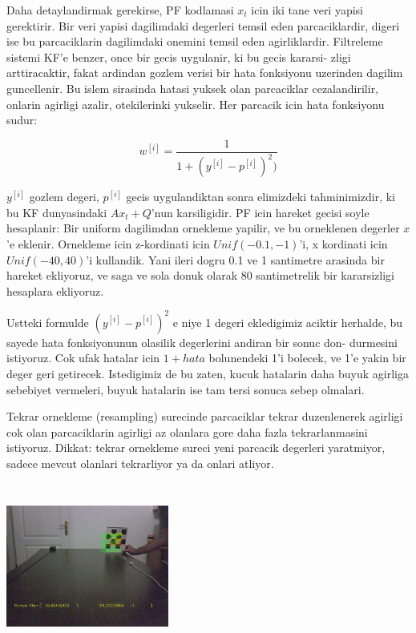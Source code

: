 \documentclass[12pt,fleqn]{article}\usepackage{../common}
\begin{document}
Daha detaylandirmak gerekirse, PF kodlamasi $x_t$ icin iki tane veri yapisi
gerektirir. Bir veri yapisi dagilimdaki degerleri temsil eden
parcaciklardir, digeri ise bu parcaciklarin dagilimdaki onemini temsil eden
agirliklardir.  Filtreleme sistemi KF'e benzer, once bir gecis uygulanir,
ki bu gecis kararsi- zligi arttiracaktir, fakat ardindan gozlem verisi bir
hata fonksiyonu uzerinden dagilim guncellenir. Bu islem sirasinda hatasi
yuksek olan parcaciklar cezalandirilir, onlarin agirligi azalir,
otekilerinki yukselir. Her parcacik icin hata fonksiyonu sudur:

\[ 
w^{[i]} = \frac{1}{1 + (y^{[i]} - p^{[i]})^2  )}
 \]

$y^{[i]}$ gozlem degeri, $p^{[i]}$ gecis uygulandiktan sonra elimizdeki
tahminimizdir, ki bu KF dunyasindaki $Ax_t + Q$'nun karsiligidir. PF icin
hareket gecisi soyle hesaplanir: Bir uniform dagilimdan ornekleme yapilir,
ve bu orneklenen degerler $x$'e eklenir. Ornekleme icin z-kordinati icin
$Unif (-0.1, -1)$'i, x kordinati icin $Unif (-40, 40)$'i kullandik. Yani
ileri dogru 0.1 ve 1 santimetre arasinda bir hareket ekliyoruz, ve saga ve
sola donuk olarak 80 santimetrelik bir kararsizligi hesaplara ekliyoruz.

Ustteki formulde $(y^{[i]} - p^{[i]})^2$ e niye 1 degeri ekledigimiz
aciktir herhalde, bu sayede hata fonksiyonunun olasilik degerlerini andiran
bir sonuc don- durmesini istiyoruz. Cok ufak hatalar icin $1 + hata$
bolunendeki 1'i bolecek, ve 1'e yakin bir deger geri getirecek. Istedigimiz
de bu zaten, kucuk hatalarin daha buyuk agirliga sebebiyet vermeleri, buyuk
hatalarin ise tam tersi sonuca sebep olmalari.

Tekrar ornekleme (resampling) surecinde parcaciklar tekrar duzenlenerek
agirligi cok olan parcaciklarin agirligi az olanlara gore daha fazla
tekrarlanmasini istiyoruz. Dikkat: tekrar ornekleme sureci yeni parcacik
degerleri yaratmiyor, sadece mevcut olanlari tekrarliyor ya da onlari
atliyor.

\inputminted{python}{PF.py}

\inputminted{python}{track-chess-pf.py}

\includegraphics[height=4cm]{cb-pf-1.jpg}
\end{document}
